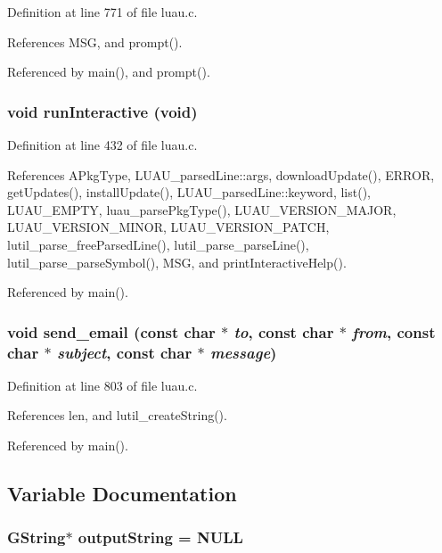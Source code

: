 Definition at line 771 of file luau.c.

References MSG, and prompt().

Referenced by main(), and prompt().
\subsubsection{\setlength{\rightskip}{0pt plus 5cm}void run\-Interactive (void)\hspace{0.3cm}{\tt  [static]}}\label{luau_8c_a9}




Definition at line 432 of file luau.c.

References APkg\-Type, LUAU\_\-parsed\-Line::args, download\-Update(), ERROR, get\-Updates(), install\-Update(), LUAU\_\-parsed\-Line::keyword, list(), LUAU\_\-EMPTY, luau\_\-parse\-Pkg\-Type(), LUAU\_\-VERSION\_\-MAJOR, LUAU\_\-VERSION\_\-MINOR, LUAU\_\-VERSION\_\-PATCH, lutil\_\-parse\_\-free\-Parsed\-Line(), lutil\_\-parse\_\-parse\-Line(), lutil\_\-parse\_\-parse\-Symbol(), MSG, and print\-Interactive\-Help().

Referenced by main().
\subsubsection{\setlength{\rightskip}{0pt plus 5cm}void send\_\-email (const char $\ast$ {\em to}, const char $\ast$ {\em from}, const char $\ast$ {\em subject}, const char $\ast$ {\em message})\hspace{0.3cm}{\tt  [static]}}\label{luau_8c_a15}




Definition at line 803 of file luau.c.

References len, and lutil\_\-create\-String().

Referenced by main().

\subsection{Variable Documentation}
\subsubsection{\setlength{\rightskip}{0pt plus 5cm}GString$\ast$ {\bf output\-String} = NULL\hspace{0.3cm}{\tt  [static]}}\label{luau_8c_a2}




